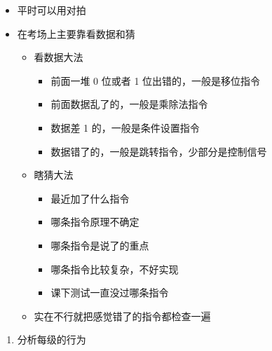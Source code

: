 \documentclass[12pt,AutoFakeBold]{article}
\providecommand{\tightlist}{%
  \setlength{\itemsep}{0pt}\setlength{\parskip}{0pt}}
\begin{document}
\begin{itemize}
\tightlist
\item
  平时可以用对拍
\item
  在考场上主要靠看数据和猜

  \begin{itemize}
  \tightlist
  \item
    看数据大法

    \begin{itemize}
    \tightlist
    \item
      前面一堆 0 位或者 1 位出错的，一般是移位指令
    \item
      前面数据乱了的，一般是乘除法指令
    \item
      数据差 1 的，一般是条件设置指令
    \item
      数据错了的，一般是跳转指令，少部分是控制信号
    \end{itemize}
  \item
    瞎猜大法

    \begin{itemize}
    \tightlist
    \item
      最近加了什么指令
    \item
      哪条指令原理不确定
    \item
      哪条指令是说了的重点
    \item
      哪条指令比较复杂，不好实现
    \item
      课下测试一直没过哪条指令
    \end{itemize}
  \item
    实在不行就把感觉错了的指令都检查一遍
  \end{itemize}
\end{itemize}

\begin{enumerate}
\def\labelenumi{\arabic{enumi}.}
\setcounter{enumi}{1}
\tightlist
\item
  分析每级的行为
\end{enumerate}
\end{document}
